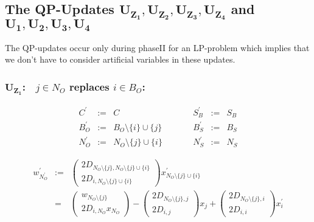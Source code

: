 \documentclass[a4paper]{article}
\begin{document}


\subsection{The QP-Updates $\mathbf{U_{Z_{1}}}, \mathbf{U_{Z_{2}}},
  \mathbf{U_{Z_{3}}}, \mathbf{U_{Z_{4}}}$ and $\mathbf{U_{1}}, \mathbf{U_{2}},
  \mathbf{U_{3}}, \mathbf{U_{4}}$}
The QP-updates occur only during phaseII for an LP-problem which implies that
we don't have to consider artificial variables in these updates.

\subsubsection{$\mathbf{U_{Z_{1}}}$:$\quad j \in N_{O}$ replaces $i \in B_{O}$:}
\begin{equation}
\label{update:o_z_rep_o}
\begin{array}{ccccccc}
C^{\prime}      &:=&  C
&\quad\quad&
S_{B}^{\prime}  &:=&  S_{B}  \\
B_{O}^{\prime}  &:=&  B_{O} \setminus \{i\} \cup \{j\}
&\quad\quad&
B_{S}^{\prime}  &:=&  B_{S} \\
N_{O}^{\prime}  &:=&  N_{O} \setminus\{j\} \cup \{i\}
&\quad\quad&
N_{S}^{\prime}  &:=&  N_{S}
\end{array}
\end{equation}

\begin{eqnarray}
w_{N_{O}^{\prime}}^{\prime}
&:=&
\left(
\begin{array}{c}
2D_{N_{O} \setminus\{j\}, N_{O} \setminus\{j\} \cup \{i\}} \\
\hline
2D_{i, N_{O} \setminus\{j\} \cup \{i\}}
\end{array}
\right)
x_{N_{O} \setminus\{j\} \cup \{i\}}^{\prime}
\nonumber \\
&=&
\left(
\begin{array}{c}
w_{N_{O} \setminus\{j\}} \\
\hline
2D_{i, N_{O}}x_{N_{O}}
\end{array}
\right)
-
\left(
\begin{array}{c}
2D_{N_{O} \setminus\{j\}, j} \\
\hline
2D_{i, j}
\end{array}
\right)
x_{j}
+
\left(
\begin{array}{c}
2D_{N_{O} \setminus\{j\}, i} \\
\hline
2D_{i, i}
\end{array}
\right)
x_{i}^{\prime}
\end{eqnarray}
\end{document}
